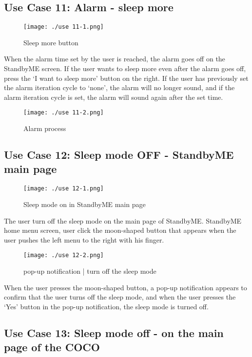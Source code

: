 \documentclass[conference]{IEEEtran}
\begin{document}
\subsection{Use Case 11: Alarm - sleep more}

\begin{figure}[H]
\texttt{[image: ./use 11-1.png]}
\centering
\caption{Sleep more button}
\end{figure}

When the alarm time set by the user is reached, the alarm goes off on the StandbyME screen. If the user wants to sleep more even after the alarm goes off, press the ‘I want to sleep more' button on the right. If the user has previously set the alarm iteration cycle to ‘none', the alarm will no longer sound, and if the alarm iteration cycle is set, the alarm will sound again after the set time.

\begin{figure}[H]
\texttt{[image: ./use 11-2.png]}
\centering
\caption{Alarm process}
\end{figure}

\subsection{Use Case 12: Sleep mode OFF - StandbyME main page}

\begin{figure}[H]
\texttt{[image: ./use 12-1.png]}
\centering
\caption{Sleep mode on in StandbyME main page}
\end{figure}

The user turn off the sleep mode on the main page of StandbyME. StandbyME home menu screen, user click the moon-shaped button that appears when the user pushes the left menu to the right with his finger.

\begin{figure}[H]
\texttt{[image: ./use 12-2.png]}
\centering
\caption{pop-up notification | turn off the sleep mode}
\end{figure}

When the user presses the moon-shaped button, a pop-up notification appears to confirm that the user turns off the sleep mode, and when the user presses the ‘Yes' button in the pop-up notification, the sleep mode is turned off.

\subsection{Use Case 13: Sleep mode off - on the main page of the COCO}
\end{document}

